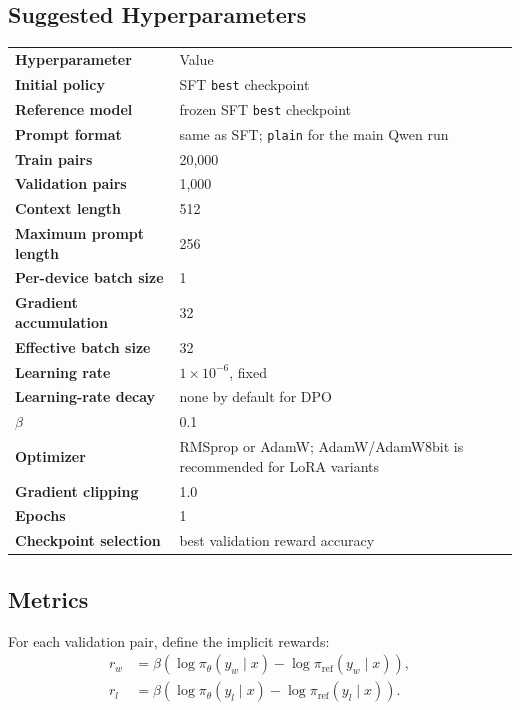 \documentclass[11pt]{article}
\begin{document}
\subsection{Suggested Hyperparameters}
\begin{center}
\renewcommand{\arraystretch}{1.16}
\begin{tabularx}{0.88\textwidth}{>{\bfseries\color{DeepNavy}}p{} X}
\rowcolor{MistBlue}
Hyperparameter & Value \\
Initial policy & SFT \texttt{best} checkpoint \\
\rowcolor{MistTeal} Reference model & frozen SFT \texttt{best} checkpoint \\
Prompt format & same as SFT; \texttt{plain} for the main Qwen run \\
\rowcolor{MistTeal} Train pairs & 20,000 \\
Validation pairs & 1,000 \\
\rowcolor{MistTeal} Context length & 512 \\
Maximum prompt length & 256 \\
\rowcolor{MistTeal} Per-device batch size & 1 \\
Gradient accumulation & 32 \\
\rowcolor{MistTeal} Effective batch size & 32 \\
\rowcolor{MistAmber} Learning rate & $1\times 10^{-6}$, fixed \\
Learning-rate decay & none by default for DPO \\
\rowcolor{MistAmber} $\beta$ & 0.1 \\
Optimizer & RMSprop or AdamW; AdamW/AdamW8bit is recommended for LoRA variants \\
\rowcolor{MistTeal} Gradient clipping & 1.0 \\
Epochs & 1 \\
Checkpoint selection & best validation reward accuracy \\
\end{tabularx}
\end{center}

\subsection{Metrics}
For each validation pair, define the implicit rewards:
\begin{align}
  r_w &= \beta \left(\log \pi_\theta(y_w \mid x) - \log \pi_{\mathrm{ref}}(y_w \mid x)\right), \\
  r_l &= \beta \left(\log \pi_\theta(y_l \mid x) - \log \pi_{\mathrm{ref}}(y_l \mid x)\right).
\end{align}
\end{document}
